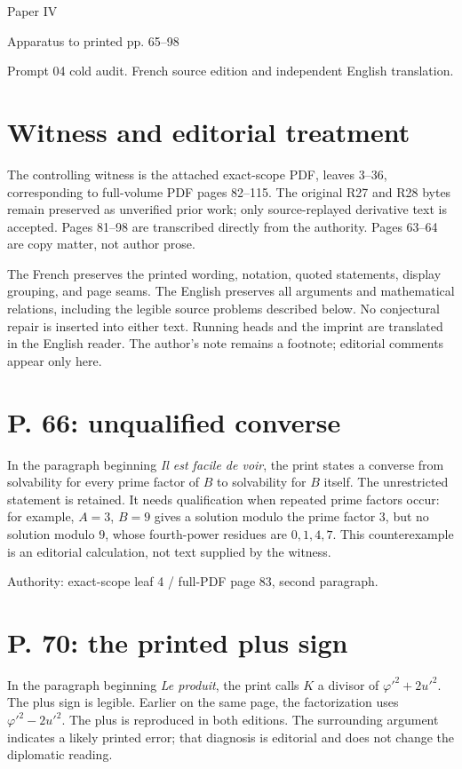 \documentclass[11pt]{article}
\begin{document}
{\LARGE Paper IV}\par
{\large Apparatus to printed pp. 65–98}\par
Prompt 04 cold audit. French source edition and independent English translation.

\section*{Witness and editorial treatment}
The controlling witness is the attached exact-scope PDF, leaves 3–36, corresponding
to full-volume PDF pages 82–115. The original R27 and R28 bytes remain preserved
as unverified prior work; only source-replayed derivative text is accepted.
Pages 81–98 are transcribed directly from the authority. Pages 63–64 are copy matter, not author prose.

The French preserves the printed wording, notation, quoted statements, display
grouping, and page seams. The English preserves all arguments and mathematical
relations, including the legible source problems described below. No conjectural
repair is inserted into either text. Running heads and the imprint are translated
in the English reader. The author’s note remains a footnote; editorial comments
appear only here.

\section*{P. 66: unqualified converse}
In the paragraph beginning \emph{Il est facile de voir}, the print states a converse
from solvability for every prime factor of $B$ to solvability for $B$ itself.
The unrestricted statement is retained. It needs qualification when repeated prime
factors occur: for example, $A=3$, $B=9$ gives a solution modulo the prime factor $3$,
but no solution modulo $9$, whose fourth-power residues are $0,1,4,7$.
This counterexample is an editorial calculation, not text supplied by the witness.

Authority: exact-scope leaf 4 / full-PDF page 83, second paragraph.

\section*{P. 70: the printed plus sign}
In the paragraph beginning \emph{Le produit}, the print calls $K$ a divisor of
$\varphi'^2+2u'^2$. The plus sign is legible. Earlier on the same page, the factorization
uses $\varphi'^2-2u'^2$. The plus is reproduced in both editions. The surrounding
argument indicates a likely printed error; that diagnosis is editorial and does
not change the diplomatic reading.
\end{document}
